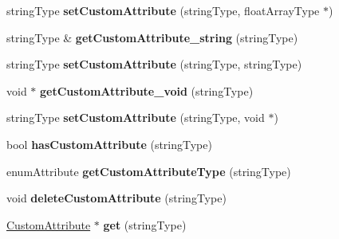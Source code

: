 \begin{DoxyCompactItemize}
\item 
\hypertarget{classAbstractComponent_a2d06037834d44db0045ea5c2141fb908}{string\-Type {\bfseries set\-Custom\-Attribute} (string\-Type, float\-Array\-Type $\ast$)}\label{classAbstractComponent_a2d06037834d44db0045ea5c2141fb908}

\item 
\hypertarget{classAbstractComponent_a1b282ac872c28768ce912136ba7ec56c}{string\-Type \& {\bfseries get\-Custom\-Attribute\-\_\-string} (string\-Type)}\label{classAbstractComponent_a1b282ac872c28768ce912136ba7ec56c}

\item 
\hypertarget{classAbstractComponent_a9fbcef04305bdf8cc2c6269dec2a3d09}{string\-Type {\bfseries set\-Custom\-Attribute} (string\-Type, string\-Type)}\label{classAbstractComponent_a9fbcef04305bdf8cc2c6269dec2a3d09}

\item 
\hypertarget{classAbstractComponent_a5a5cfed02e2693d2cbef9b3af100c28e}{void $\ast$ {\bfseries get\-Custom\-Attribute\-\_\-void} (string\-Type)}\label{classAbstractComponent_a5a5cfed02e2693d2cbef9b3af100c28e}

\item 
\hypertarget{classAbstractComponent_a54b26d7ba3123cca27eb221c3da9d2b6}{string\-Type {\bfseries set\-Custom\-Attribute} (string\-Type, void $\ast$)}\label{classAbstractComponent_a54b26d7ba3123cca27eb221c3da9d2b6}

\item 
\hypertarget{classAbstractComponent_a92712d9fe0b653bc49bc6e01ce4b05c3}{bool {\bfseries has\-Custom\-Attribute} (string\-Type)}\label{classAbstractComponent_a92712d9fe0b653bc49bc6e01ce4b05c3}

\item 
\hypertarget{classAbstractComponent_addeb6b2862658b55c78006cd755bcf84}{enum\-Attribute {\bfseries get\-Custom\-Attribute\-Type} (string\-Type)}\label{classAbstractComponent_addeb6b2862658b55c78006cd755bcf84}

\item 
\hypertarget{classAbstractComponent_a11ef6b9ea5242e477dd0f5698c9d52a8}{void {\bfseries delete\-Custom\-Attribute} (string\-Type)}\label{classAbstractComponent_a11ef6b9ea5242e477dd0f5698c9d52a8}

\item 
\hypertarget{classAbstractComponent_ac7db877abac771d44de56a59f1ad8b2a}{\hyperlink{classCustomAttribute}{Custom\-Attribute} $\ast$ {\bfseries get} (string\-Type)}\label{classAbstractComponent_ac7db877abac771d44de56a59f1ad8b2a}


\end{DoxyCompactItemize}
